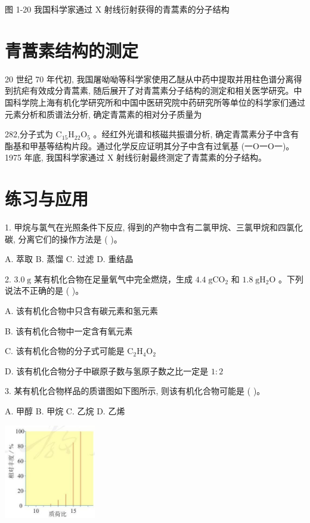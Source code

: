 \documentclass[10pt]{article}
\begin{document}
图 1-20 我国科学家通过 \(\mathrm{X}\) 射线衍射获得的青蒿素的分子结构

\section*{青蒿素结构的测定}

20 世纪 70 年代初, 我国屠呦呦等科学家使用乙醚从中药中提取并用柱色谱分离得到抗疟有效成分青蒿素, 随后展开了对青蒿素分子结构的测定和相关医学研究。中国科学院上海有机化学研究所和中国中医研究院中药研究所等单位的科学家们通过元素分析和质谱法分析, 确定青蒿素的相对分子质量为

282,分子式为 \({\mathrm{C}}_{15}{\mathrm{H}}_{22}{\mathrm{O}}_{5}\) 。经红外光谱和核磁共振谱分析, 确定青蒿素分子中含有酯基和甲基等结构片段。通过化学反应证明其分子中含有过氧基 (一O一O一)。1975 年底, 我国科学家通过 \(\mathrm{X}\) 射线衍射最终测定了青蒿素的分子结构。

\section*{练习与应用}

1. 甲烷与氯气在光照条件下反应, 得到的产物中含有二氯甲烷、三氯甲烷和四氯化碳, 分离它们的操作方法是 ( )。

A. 萃取 B. 蒸馏 C. 过滤 D. 重结晶

2. \({3.0}\mathrm{\;g}\) 某有机化合物在足量氧气中完全燃烧，生成 \({4.4}\mathrm{\;g}{\mathrm{{CO}}}_{2}\) 和 \({1.8}\mathrm{\;g}{\mathrm{H}}_{2}\mathrm{O}\) 。下列说法不正确的是 ( )。

A. 该有机化合物中只含有碳元素和氢元素

B. 该有机化合物中一定含有氧元素

C. 该有机化合物的分子式可能是 \({\mathrm{C}}_{2}{\mathrm{H}}_{4}{\mathrm{O}}_{2}\)

D. 该有机化合物分子中碳原子数与氢原子数之比一定是 \(1 : 2\)

3. 某有机化合物样品的质谱图如下图所示, 则该有机化合物可能是 ( )。

A. 甲醇 B. 甲烷 C. 乙烷 D. 乙烯

\begin{center}
\includegraphics[max width=0.3\textwidth]{images/0190efc5-b58a-7c43-bfb0-e0a030df9cfd_26_460163.jpg}
\end{center}
\end{document}
